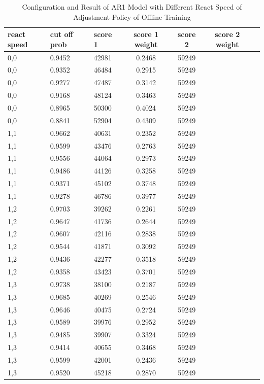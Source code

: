 \documentclass{article}
\begin{document}
\begin{longtable}[htbp]{l|l|l|*{4}{c}}
    \caption{Configuration and Result of AR1 Model with Different React Speed of Adjustment Policy of Offline Training}
    \label{tab:tab1.8.1} \\
    \textbf{react speed} & \textbf{cut off prob} & \textbf{score 1} & \textbf{score 1 weight} & \textbf{score 2} & \textbf{score 2 weight} \\
    \hline
    0,0 & 0.9452 & 42981 & 0.2468 & 59249\\
    0,0 & 0.9352 & 46484 & 0.2915 & 59249\\
    0,0 & 0.9277 & 47487 & 0.3142 & 59249\\
    0,0 & 0.9168 & 48124 & 0.3463 & 59249\\
    0,0 & 0.8965 & 50300 & 0.4024 & 59249\\
    0,0 & 0.8841 & 52904 & 0.4309 & 59249\\
    1,1 & 0.9662 & 40631 & 0.2352 & 59249\\
    1,1 & 0.9599 & 43476 & 0.2763 & 59249\\
    1,1 & 0.9556 & 44064 & 0.2973 & 59249\\
    1,1 & 0.9486 & 44126 & 0.3258 & 59249\\
    1,1 & 0.9371 & 45102 & 0.3748 & 59249\\
    1,1 & 0.9278 & 46786 & 0.3977 & 59249\\
    1,2 & 0.9703 & 39262 & 0.2261 & 59249\\
    1,2 & 0.9647 & 41736 & 0.2644 & 59249\\
    1,2 & 0.9607 & 42116 & 0.2838 & 59249\\
    1,2 & 0.9544 & 41871 & 0.3092 & 59249\\
    1,2 & 0.9436 & 42277 & 0.3518 & 59249\\
    1,2 & 0.9358 & 43423 & 0.3701 & 59249\\
    1,3 & 0.9738 & 38100 & 0.2187 & 59249\\
    1,3 & 0.9685 & 40269 & 0.2546 & 59249\\
    1,3 & 0.9646 & 40475 & 0.2724 & 59249\\
    1,3 & 0.9589 & 39976 & 0.2952 & 59249\\
    1,3 & 0.9485 & 39907 & 0.3324 & 59249\\
    1,3 & 0.9414 & 40655 & 0.3468 & 59249\\
    1,3 & 0.9599 & 42001 & 0.2436 & 59249\\
    1,3 & 0.9520 & 45218 & 0.2870 & 59249\\

\end{longtable}
\end{document}
